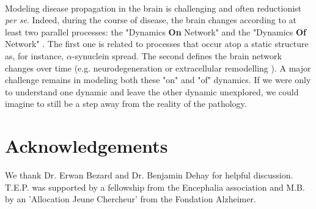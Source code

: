 \\
Modeling disease propagation in the brain is challenging and often reductionist \textit{per se}. Indeed, during the course of disease, the brain changes according to at least two parallel processes: the "Dynamics \textbf{On} Network" and the "Dynamics \textbf{Of} Network" \cite{Raj_2018}. The first one is related to processes that occur atop a static structure as, for instance, $\alpha$-synuclein spread. The second defines the brain network changes over time (e.g. neurodegeneration or extracellular remodelling \cite{Soria_2020}). A major challenge remains in modeling both these "on" and "of" dynamics. If we were only to understand one dynamic and leave the other dynamic unexplored, we could imagine to still be a step away from the reality of the pathology. 

\section{Acknowledgements}
We thank Dr. Erwan Bezard and Dr. Benjamin Dehay for helpful discussion. T.E.P. was supported by a fellowship from the Encephalia association and M.B. by an 'Allocation Jeune Chercheur' from the Fondation Alzheimer.
